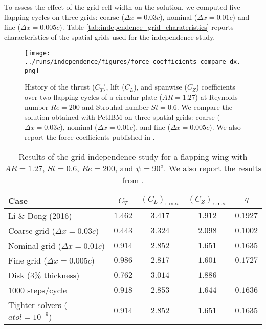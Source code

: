 To assess the effect of the grid-cell width on the solution, we computed five flapping cycles on three grids: coarse ($\Delta x = 0.03c$), nominal ($\Delta x = 0.01c$) and fine ($\Delta x = 0.005c$).
Table \ref{tab:independence_grid_charateristics} reports characteristics of the spatial grids used for the independence study.

\begin{figure}
  \centering
  \texttt{[image: ../runs/independence/figures/force\_coefficients\_compare\_dx.png]}
  \caption{History of the thrust ($C_T$), lift ($C_L$), and spanwise ($C_Z$) coefficients over two flapping cycles of a circular plate ($AR = 1.27$) at Reynolds number $Re = 200$ and Strouhal number $St = 0.6$. We compare the solution obtained with PetIBM on three spatial grids: coarse ($\Delta x = 0.03c$), nominal ($\Delta x = 0.01c$), and fine ($\Delta x = 0.005c$). We also report the force coefficients published in \citet{li_dong_2016}.}
  \label{fig:independence_force_coefficients_dx}
\end{figure}

\begin{table}
  \centering
  \begin{tabular}{lcccc}
    \hline\hline
    Case & $\overline{C_T}$ & $\left( C_L \right)_\text{r.m.s.}$ & $\left( C_Z \right)_\text{r.m.s.}$ & $\eta$ \\
    \hline
    Li \& Dong (2016) & $1.462$ & $3.417$ & $1.912$ & $0.1927$ \\
    Coarse grid ($\Delta x = 0.03c$) & $0.443$ & $3.324$ & $2.098$ & $0.1002$ \\
    Nominal grid ($\Delta x = 0.01c$) & $0.914$ & $2.852$ & $1.651$ & $0.1635$ \\
    Fine grid ($\Delta x = 0.005c$) & $0.986$ & $2.817$ & $1.601$ & $0.1727$ \\
    Disk ($3\%$ thickness) & $0.762$ & $3.014$ & $1.886$ & $-$ \\
    $1000$ steps/cycle & $0.918$ & $2.853$ & $1.644$ & $0.1636$ \\
    Tighter solvers ($atol = 10^{-9}$) & $0.914$ & $2.852$ & $1.651$ & $0.1635$ \\
    \hline\hline
  \end{tabular}
  \caption{Results of the grid-independence study for a flapping wing with $AR = 1.27$, $St = 0.6$, $Re = 200$, and $\psi = 90^o$. We also report the results from \citet{li_dong_2016}.}
  \label{tab:independence_results}
\end{table}

